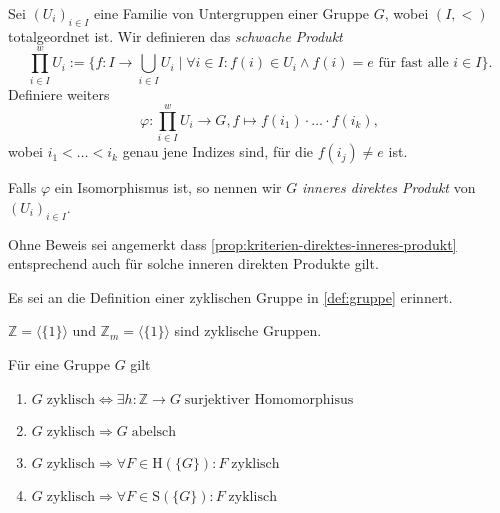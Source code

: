 \begin{remark}
    Sei $(U_i)_{i \in I}$ eine Familie von Untergruppen einer Gruppe $G$, wobei $(I, <)$ totalgeordnet ist. Wir definieren das \emph{schwache Produkt} 
    $$ \prod_{i \in I}^w U_i := \{ f : I \to \bigcup_{i \in I} U_i \mid \forall i \in I: f(i) \in U_i \land f(i) = e \textrm{ für fast alle } i \in I \}. $$
    Definiere weiters
    $$ \varphi : \prod_{i \in I}^w U_i \to G, f \mapsto f(i_1) \cdot \hdots \cdot f(i_k), $$
    wobei $i_1 < \hdots < i_k $ genau jene Indizes sind, für die $f(i_j) \neq e$ ist.

    Falls $\varphi$ ein Isomorphismus ist, so nennen wir $G$ \emph{inneres direktes Produkt} von $(U_i)_{i \in I}$.

    Ohne Beweis sei angemerkt dass \cref{prop:kriterien-direktes-inneres-produkt} entsprechend auch für solche inneren direkten Produkte gilt.
\end{remark}


Es sei an die Definition einer zyklischen Gruppe in \cref{def:gruppe} erinnert.

\begin{example}
    $\mathbb{Z} = \langle \{1\}\rangle$ und $\mathbb{Z}_m = \langle\{1\}\rangle$ sind zyklische Gruppen.
\end{example}

\begin{proposition}\label{prop:zyklische_gruppen_1} Für eine Gruppe $G$ gilt
    \begin{enumerate}
        \item $G\;\text{zyklisch} \Leftrightarrow \exists h: \mathbb{Z} \to G\;\text{surjektiver Homomorphisus}$
        \item $G\;\text{zyklisch} \Rightarrow G\;\text{abelsch}$
        \item $G\;\text{zyklisch} \Rightarrow \forall F \in \textrm{H}(\{G\}): F\;\text{zyklisch}$
        \item $G\;\text{zyklisch} \Rightarrow \forall F \in \textrm{S}(\{G\}): F\;\text{zyklisch}$
    \end{enumerate}
\end{proposition}

